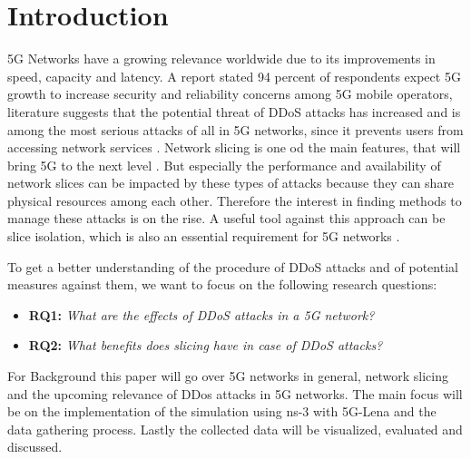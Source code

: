 

\chapter{Introduction}
\label{chapter:introduction}

5G Networks have a growing relevance worldwide due to its improvements in speed, capacity and latency. A report stated 94 percent of respondents expect 5G growth to increase security and reliability concerns among 5G mobile operators, literature suggests that the potential threat of DDoS attacks has increased and is among the most serious attacks of all in 5G networks, since it prevents users from accessing network services \cite{huang2021trend}. Network slicing is one od the main features, that will bring 5G to the next level \cite{zhang2019overview}. But especially the performance and availability of network slices can be impacted by these types of attacks because they can share physical resources among each other. Therefore the interest in finding methods to manage these attacks is on the rise. A useful tool against this approach can be slice isolation, which is also an essential requirement for 5G networks \cite{sattar2019towards}.

To get a better understanding of the procedure of DDoS attacks and of potential measures against them, we want to focus on the following research questions:
\begin{addmargin}[20pt]{0pt}
    \begin{itemize}
        \item \textbf{RQ1: }\textit{What are the effects of DDoS attacks in a 5G network?}
        \item \textbf{RQ2: }\textit{What benefits does slicing have in case of DDoS attacks?}
    \end{itemize}
\end{addmargin}

For Background this paper will go over 5G networks in general, network slicing and the upcoming relevance of DDos attacks in 5G networks. The main focus will be on the implementation of the simulation using ns-3 with 5G-Lena and the data gathering process. Lastly the collected data will be visualized, evaluated and discussed.
